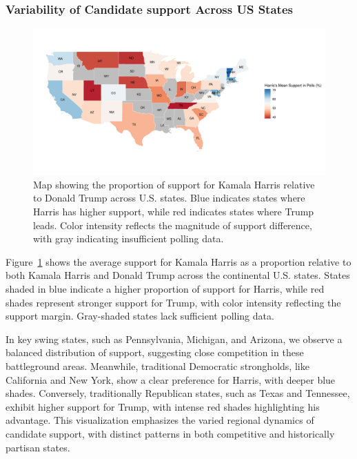\documentclass[
  letterpaper,
  DIV=11,
  numbers=noendperiod]{scrartcl}
\begin{document}
\hypertarget{variability-of-candidate-support-across-us-states}{%
\subsubsection{Variability of Candidate support Across US
States}\label{variability-of-candidate-support-across-us-states}}

\begin{figure}

{\centering \includegraphics{paper_files/figure-pdf/fig-map1-1.pdf}

}

\caption{\label{fig-map1}Map showing the proportion of support for
Kamala Harris relative to Donald Trump across U.S. states. Blue
indicates states where Harris has higher support, while red indicates
states where Trump leads. Color intensity reflects the magnitude of
support difference, with gray indicating insufficient polling data.}

\end{figure}

Figure~\ref{fig-map1} shows the average support for Kamala Harris as a
proportion relative to both Kamala Harris and Donald Trump across the
continental U.S. states. States shaded in blue indicate a higher
proportion of support for Harris, while red shades represent stronger
support for Trump, with color intensity reflecting the support margin.
Gray-shaded states lack sufficient polling data.

In key swing states, such as Pennsylvania, Michigan, and Arizona, we
observe a balanced distribution of support, suggesting close competition
in these battleground areas. Meanwhile, traditional Democratic
strongholds, like California and New York, show a clear preference for
Harris, with deeper blue shades. Conversely, traditionally Republican
states, such as Texas and Tennessee, exhibit higher support for Trump,
with intense red shades highlighting his advantage. This visualization
emphasizes the varied regional dynamics of candidate support, with
distinct patterns in both competitive and historically partisan states.
\end{document}
